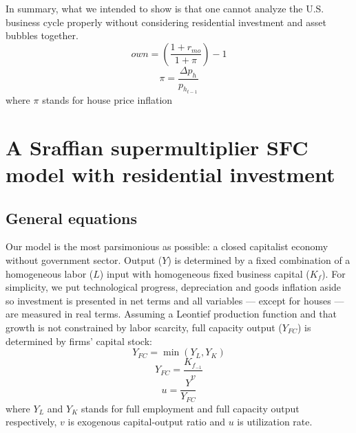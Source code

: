 \documentclass[11pt]{article}
\begin{document}
In summary, what we intended to show is that one cannot analyze the U.S. business cycle properly without considering residential investment and asset bubbles together.
\begin{equation}
\label{_own}
own = \left(\frac{1+r_{mo}}{1+\pi}\right) -1
\end{equation}
$$
\pi = \frac{\Delta p_h}{p_{h_{t-1}}}
$$
where \(\pi\) stands for house price inflation


\section{A Sraffian supermultiplier SFC model with residential investment}
\label{sec:org5d46219}
\label{sec:Model}
\subsection{General equations}
\label{sec:org14c154b}

Our model is the most parsimonious as possible: a closed capitalist economy without government sector. Output (\(Y\)) is determined by  a fixed combination of a homogeneous labor (\(L\)) input with homogeneous fixed business capital (\(K_f\)). 
For simplicity, we put technological progress, depreciation and goods inflation aside so investment is presented in net terms and all variables --- except for houses --- are measured in real terms.
Assuming a Leontief production function and that growth is not constrained by labor scarcity, full capacity output (\(Y_{FC}\)) is
determined by firms' capital stock:
\begin{equation}
\label{_Leontieff}
    Y_{FC} = \min (Y_L, Y_K)
\end{equation}
\begin{equation}
\label{_YFC}
    Y_{FC} = \frac{K_{f_{-1}}}{v}
\end{equation}
\begin{equation}
\label{_u}
    u = \frac{Y}{Y_{FC}}
\end{equation}
where \(Y_L\) and \(Y_K\) stands for full employment and full capacity output respectively, \(v\) is exogenous capital-output ratio and \(u\) is utilization rate.
\end{document}
